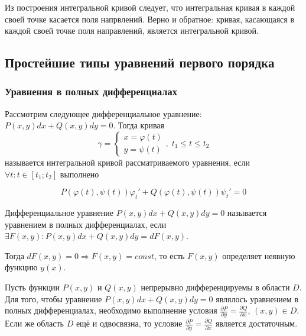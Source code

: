     Из построения интегральной кривой следует, что интегральная кривая в каждой своей точке касается поля напрвлений. Верно и обратное: кривая, касающаяся в каждой своей точке поля направлений, является интегральной кривой.

    \subsection{Простейшие типы уравнений первого порядка}
    \subsubsection{Уравнения в полных дифференциалах}

    Рассмотрим следующее дифференциальное уравнение: $P(x, y)dx + Q(x, y)dy = 0$. Тогда кривая 
    \begin{equation*}
        \gamma = 
        \begin{cases}
            x = \varphi(t) \\ 
            y = \psi(t)
        \end{cases}, \; t_1 \leqslant t \leqslant t_2
    \end{equation*}
    называется интегральной кривой рассматриваемого уравнения, если $\forall t: t \in [t_1; t_2]$ выполнено

    \begin{equation*}
        P(\varphi(t), \psi(t)) \varphi_t' + Q(\varphi(t), \psi(t)) \psi_t' = 0
    \end{equation*}
   
    \begin{definition}
        Дифференциальное уравнение $P(x, y)dx + Q(x, y)dy = 0$ называется уравнением в полных дифференциалах, если $\exists F(x, y): P(x, y)dx + Q(x, y)dy = dF(x, y)$. 
    \end{definition}

    Тогда $dF(x, y) = 0 \Rightarrow F(x, y) = const$, то есть $F(x, y)$ определяет неявную функцию $y(x)$.

    \begin{theorem}
        Пусть функции $P(x, y)$ и $Q(x, y)$ непрерывно дифференцируемы в области $D$. Для того, чтобы уравнение $P(x, y)dx + Q(x, y)dy = 0$ являлось уравнением в полных дифференциалах, необходимо выполнение условия $\frac{\partial P}{\partial y} = \frac{\partial Q}{\partial x}$, $(x ,y) \in D$. Если же область $D$ ещё и одвосвязна, то условие $\frac{\partial P}{\partial y} = \frac{\partial Q}{\partial x}$ является достаточным.
    \end{theorem}


